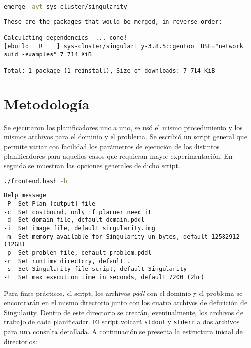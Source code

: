 \documentclass[a4paper,12pt,twocolumn]{article}
\begin{document}
\begin{lstlisting}[language=sh]
  emerge -avt sys-cluster/singularity
\end{lstlisting}
\begin{lstlisting}[style=consola]
  These are the packages that would be merged, in reverse order:

Calculating dependencies  ... done!
[ebuild   R    ] sys-cluster/singularity-3.8.5::gentoo  USE="network suid -examples" 7 714 KiB

Total: 1 package (1 reinstall), Size of downloads: 7 714 KiB
\end{lstlisting}

\section{Metodología}

Se ejecutaron los planificadores uno a uno, se usó el mismo procedimiento y los mismos archivos para el dominio y el problema. Se escribió un script general que permite variar con facilidad los parámetros de ejecución de los distintos planificadores para aquellos casos que requieran mayor experimentación. En seguida se muestran las opciones generales de dicho \href{https://gitlab.com/genomorro/unir/-/blob/RPA-01/planners/scorpion/frontend.bash}{script}.

\begin{lstlisting}[language=sh]
  ./frontend.bash -h  
\end{lstlisting}

\begin{lstlisting}[style=consola]
Help message
-P  Set Plan [output] file
-c  Set costbound, only if planner need it
-d  Set domain file, default domain.pddl
-i  Set image file, default singularity.img
-m  Set memory available for Singularity un bytes, default 12582912 (12GB)
-p  Set problem file, default problem.pddl
-r  Set runtime directory, default .
-s  Set Singularity file script, default Singularity
-t  Set max execution time in seconds, default 7200 (2hr)
\end{lstlisting}

Para fines prácticos, el script, los archivos \emph{pddl} con el dominio y el problema se encontrarán en el mismo directorio junto con los cuatro archivos de definición de Singularity\citep[sec. Interact with images]{Sylabs_2021}. Dentro de este directorio se crearán, eventualmente, los archivos de trabajo de cada planificador.  El script volcará \texttt{stdout} y \texttt{stderr} a dos archivos para una consulta detallada. A continuación se presenta la estructura inicial de directorios:
\end{document}
